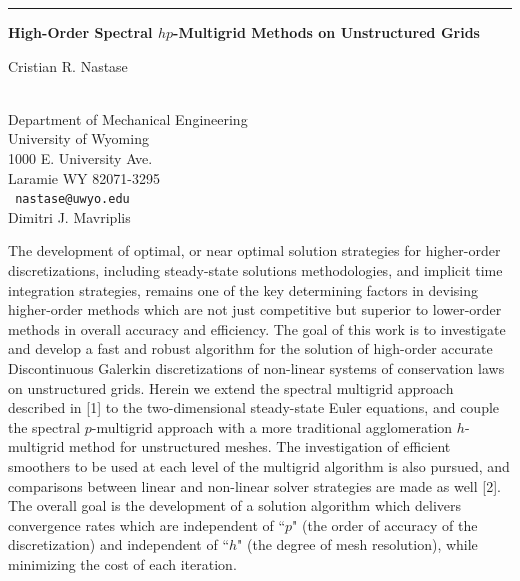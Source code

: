 \documentclass[twosided]{report}
\begin{document}
\begin{center}

\rule{6in}{1pt}
\end{center}

\begin{center}
{\large			\label{nastase}
{\bf
High-Order Spectral $hp$-Multigrid Methods on Unstructured Grids
}

Cristian R. Nastase} \\
Department of Mechanical Engineering \\
University of Wyoming \\
1000 E. University Ave. \\
Laramie WY 82071-3295
\\ {\tt
nastase@uwyo.edu
}
\\
Dimitri J. Mavriplis
\end{center}

The development of optimal, or near optimal solution strategies for
higher-order discretizations, including steady-state solutions
methodologies, and implicit time integration strategies, remains one of
the key determining factors in devising higher-order methods which are
not just competitive but superior to lower-order methods in overall
accuracy and efficiency. The goal of this work is to investigate and
develop a fast and robust algorithm for the solution of high-order
accurate Discontinuous Galerkin discretizations of non-linear systems
of conservation laws on unstructured grids. Herein we extend the
spectral multigrid approach described in [1] to the two-dimensional
steady-state Euler equations, and couple the spectral $p$-multigrid
approach with a more traditional agglomeration $h$-multigrid method for
unstructured meshes. The investigation of efficient smoothers to be
used at each level of the multigrid algorithm is also pursued, and
comparisons between linear and non-linear solver strategies are made as
well [2]. The overall goal is the development of a solution algorithm
which delivers convergence rates which are independent of ``$p$" (the
order of accuracy of the discretization) and independent of ``$h$" (the
degree of mesh resolution), while minimizing the cost of each
iteration.
\end{document}

